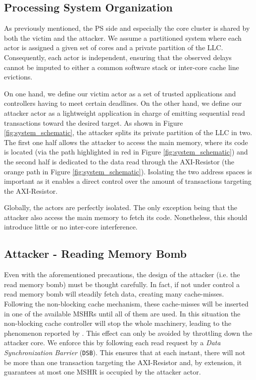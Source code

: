     \subsection{Processing System Organization}
        \label{subsec:processing_system_organization}
        As previously mentioned, the PS side and especially the core cluster is shared by both the victim and the attacker.
        We assume a partitioned system where each actor is assigned a given set of cores and a private partition of the LLC.
        Consequently, each actor is independent, ensuring that the observed delays cannot be imputed to either a common software stack or inter-core cache line evictions.

        On one hand, we define our victim actor as a set of trusted applications and controllers having to meet certain deadlines.
        On the other hand, we define our attacker actor as a lightweight application in charge of emitting sequential read transactions toward the desired target.
        As shown in Figure \ref{fig:system_schematic}, the attacker splits its private partition of the LLC in two.
        The first one half allows the attacker to access the main memory, where its code is located (via the path highlighted in red in Figure \ref{fig:system_schematic}) and the second half is dedicated to the data read through the AXI-Resistor (the orange path in Figure \ref{fig:system_schematic}).
        Isolating the two address spaces is important as it enables a direct control over the amount of transactions targeting the AXI-Resistor.

        Globally, the actors are perfectly isolated.
        The only exception being that the attacker also access the main memory to fetch its code.
        Nonetheless, this should introduce little or no inter-core interference.

    \subsection{Attacker - Reading Memory Bomb}
        \label{subsec:attacker_reading_memory_bomb}
        Even with the aforementioned precautions, the design of the attacker (i.e. the read memory bomb) must be thought carefully.
        In fact, if not under control a read memory bomb will steadily fetch data, creating many cache-misses.
        Following the non-blocking cache mechanism, these cache-misses will be inserted in one of the available MSHRs until all of them are used.
        In this situation the non-blocking cache controller will stop the whole machinery, leading to the phenomenon reported by \cite{Heechul_DDOS_attacks_on_shared_cache}.
        This effect can only be avoided by throttling down the attacker core.
        We enforce this by following each read request by a \emph{Data Synchronization Barrier} (\texttt{DSB}).
        This ensures that at each instant, there will not be more than one transaction targeting the AXI-Resistor and, by extension, it guarantees at most one MSHR is occupied by the attacker actor.

